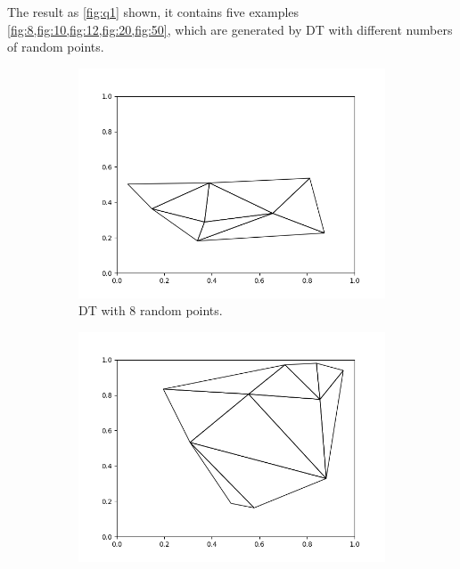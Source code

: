\documentclass[]{article}
\begin{document}
The result as \cref{fig:q1} shown, it contains five examples \cref{fig:8,fig:10,fig:12,fig:20,fig:50}, which are generated by DT with different numbers of random points.

\begin{figure}[ht]
    \centering
    \begin{subfigure}{0.30\textwidth}
        \centering
        \includegraphics[width=1\linewidth]{8p.png}
        \caption{DT with 8 random points.}
        \label{fig:8}
    \end{subfigure}
    \hfill  %
    \begin{subfigure}{0.30\textwidth}
        \centering
        \includegraphics[width=\linewidth]{10p.png}

\end{subfigure}
\end{figure}
\end{document}
